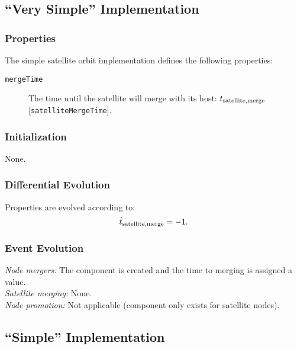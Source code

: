 \subsection{``Very Simple'' Implementation}

\subsubsection{Properties}

The simple satellite orbit implementation defines the following properties:
\begin{description}
 \item [{\tt mergeTime}] The time until the satellite will merge with its host: $t_{\rm satellite, merge}$ [{\tt satelliteMergeTime}].
\end{description}

\subsubsection{Initialization}

None.

\subsubsection{Differential Evolution}

Properties are evolved according to:
\begin{equation}
 \dot{t}_{\rm satellite, merge} = -1.
\end{equation}

\subsubsection{Event Evolution}

\noindent\emph{Node mergers:} The \gls{component} is created and the time to merging is assigned a value.\\

\noindent\emph{Satellite merging:} None.\\

\noindent\emph{Node promotion:} Not applicable (component only exists for satellite nodes).\\

\subsection{``Simple'' Implementation}\label{sec:SatelliteOrbitComponentSimple}

